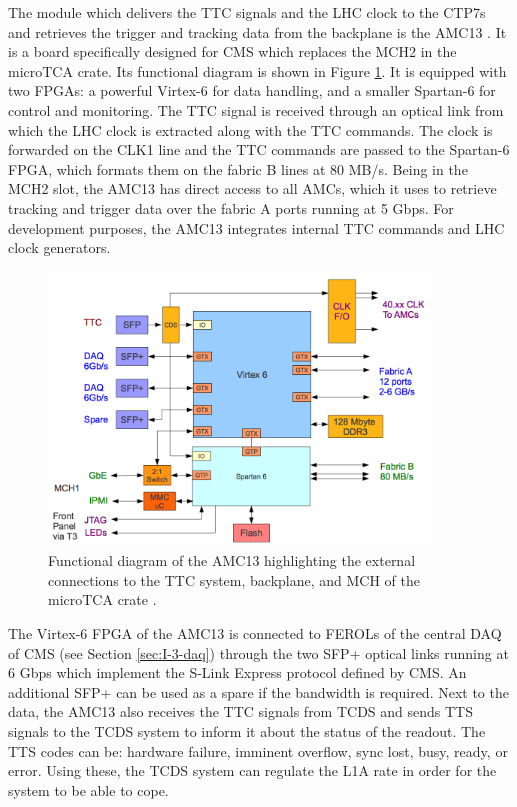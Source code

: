       The module which delivers the TTC signals and the LHC clock to the CTP7s and retrieves the trigger and tracking data from the backplane is the AMC13 \cite{AMC13}. It is a board specifically designed for CMS which replaces the MCH2 in the microTCA crate. Its functional diagram is shown in Figure \ref{fig:II-2-amc13}. It is equipped with two FPGAs: a powerful Virtex-6 for data handling, and a smaller Spartan-6 for control and monitoring. The TTC signal is received through an optical link from which the LHC clock is extracted along with the TTC commands. The clock is forwarded on the CLK1 line and the TTC commands are passed to the Spartan-6 FPGA, which formats them on the fabric B lines at 80 MB/s. Being in the MCH2 slot, the AMC13 has direct access to all AMCs, which it uses to retrieve tracking and trigger data over the fabric A ports running at 5 Gbps. For development purposes, the AMC13 integrates internal TTC commands and LHC clock generators. \\

      \begin{figure}[t!]
        \centering
        \includegraphics[width=0.9\textwidth]{img/II-2-daq/amc13.png}
        \caption{Functional diagram of the AMC13 highlighting the external connections to the TTC system, backplane, and MCH of the microTCA crate \cite{AMC13}.}
        \label{fig:II-2-amc13}
      \end{figure}

      The Virtex-6 FPGA of the AMC13 is connected to FEROLs of the central DAQ of CMS (see Section \ref{sec:I-3-daq}) through the two SFP+ optical links running at 6 Gbps which implement the S-Link Express protocol defined by CMS. An additional SFP+ can be used as a spare if the bandwidth is required. Next to the data, the AMC13 also receives the TTC signals from TCDS and sends TTS signals to the TCDS system to inform it about the status of the readout. The TTS codes can be: hardware failure, imminent overflow, sync lost, busy, ready, or error. Using these, the TCDS system can regulate the L1A rate in order for the system to be able to cope.

